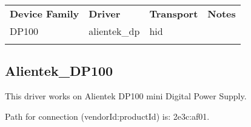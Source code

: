 \begin{tabularx}{16cm}{lllX}
\thickhline
\textbf{Device Family} & \textbf{Driver} & \textbf{Transport} & \textbf{Notes} \\
\thickhline
DP100 & alientek\_dp & hid & \\
\thickhline
\end{tabularx}

\subsection{Alientek\_DP100}

This driver works on Alientek DP100 mini Digital Power Supply.

Path for connection (vendorId:productId) is: 2e3c:af01.
